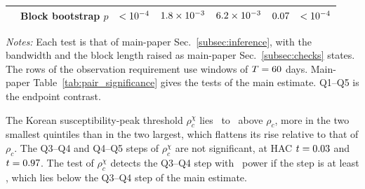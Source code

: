 \documentclass[a4paper,fleqn]{cas-sc}
\begin{document}
\begin{table}[pos=htbp]
\begin{threeparttable}
\begin{tabular}{ll ccccc}
 & Block bootstrap $p$ & $< 10^{-4}$ & $1.8 \times 10^{-3}$ & $6.2 \times 10^{-3}$ & $0.07$ & $< 10^{-4}$ \\
\bottomrule
\end{tabular}
\begin{tablenotes}
\footnotesize
\item \textit{Notes:} Each test is that of main-paper Sec.~\ref{subsec:inference}, with the bandwidth and the block length raised as main-paper Sec.~\ref{subsec:checks} states. The rows of the observation requirement use windows of $T = 60$ days. Main-paper Table~\ref{tab:pair_significance} gives the tests of the main estimate. Q1--Q5 is the endpoint contrast.
\end{tablenotes}
\end{threeparttable}
\end{table}

The Korean susceptibility-peak threshold $\rho_c^{\chi}$ lies \rhoCChiOffsetMin\ to \rhoCChiOffsetMax\ above $\rho_c$, more in the two smallest quintiles than in the two largest, which flattens its rise relative to that of $\rho_c$. The Q3--Q4 and Q4--Q5 steps of $\rho_c^{\chi}$ are not significant, at HAC $t = 0.03$ and $t = 0.97$. The test of $\rho_c^{\chi}$ detects the Q3--Q4 step with \detectPowerPct\ power if the step is at least \detectChiQthreeQfour, which lies below the Q3--Q4 step of the main estimate.
\end{document}
